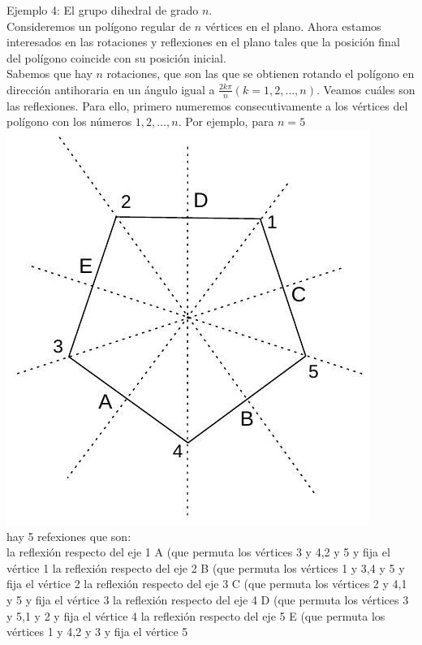 \documentclass[10pt]{article}
\begin{document}
Ejemplo 4: El grupo dihedral de grado $n$.\\
Consideremos un polígono regular de $n$ vértices en el plano. Ahora estamos interesados en las rotaciones y reflexiones en el plano tales que la posición final del polígono coincide con su posición inicial.\\
Sabemos que hay $n$ rotaciones, que son las que se obtienen rotando el polígono en dirección antihoraria en un ángulo igual a $\frac{2 k \pi}{n}(k=1,2, \ldots, n)$. Veamos cuáles son las reflexiones. Para ello, primero numeremos consecutivamente a los vértices del polígono con los números $1,2, \ldots, n$. Por ejemplo, para $n=5$\\
\includegraphics[max width=\textwidth, center]{2025_09_05_3ba26226ec0baddb5a03g-47}\\
hay 5 refexiones que son:\\
la reflexión respecto del eje 1 A (que permuta los vértices 3 y 4,2 y 5 y fija el vértice 1 la reflexión respecto del eje 2 B (que permuta los vértices 1 y 3,4 y 5 y fija el vértice 2 la reflexión respecto del eje 3 C (que permuta los vértices 2 y 4,1 y 5 y fija el vértice 3 la reflexión respecto del eje 4 D (que permuta los vértices 3 y 5,1 y 2 y fija el vértice 4 la reflexión respecto del eje 5 E (que permuta los vértices 1 y 4,2 y 3 y fija el vértice 5\\
\end{document}

